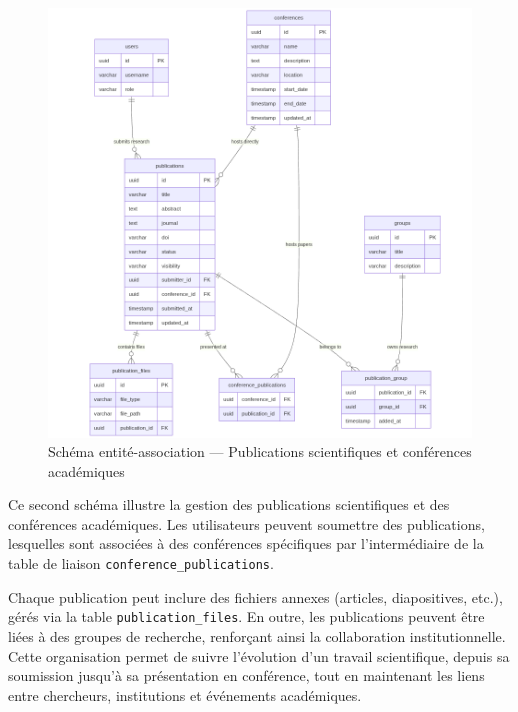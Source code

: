 \documentclass[12pt]{rapportPfe}
\begin{document}
\begin{figure}[H]
    \centering
    \includegraphics[width=1.0\textwidth]{diagrams/diagram7.png}
    \caption{Schéma entité-association — Publications scientifiques et conférences académiques}
    \label{fig:diagram7}
\end{figure}

Ce second schéma illustre la gestion des publications scientifiques et des conférences académiques. Les utilisateurs peuvent soumettre des publications, lesquelles sont associées à des conférences spécifiques par l’intermédiaire de la table de liaison \texttt{conference\_publications}. 

Chaque publication peut inclure des fichiers annexes (articles, diapositives, etc.), gérés via la table \texttt{publication\_files}. En outre, les publications peuvent être liées à des groupes de recherche, renforçant ainsi la collaboration institutionnelle. Cette organisation permet de suivre l’évolution d’un travail scientifique, depuis sa soumission jusqu’à sa présentation en conférence, tout en maintenant les liens entre chercheurs, institutions et événements académiques.
\end{document}
